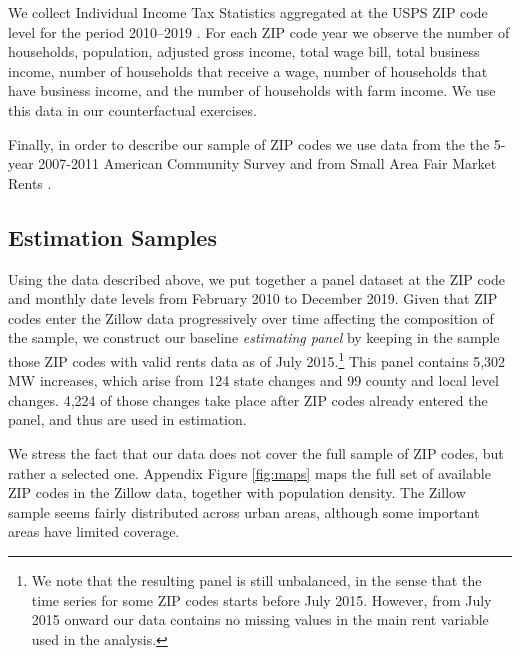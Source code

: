 We collect Individual Income Tax Statistics aggregated at the USPS ZIP code 
level for the period 2010--2019 \parencite{IRS}.
For each ZIP code year we observe the number of households, population, adjusted 
gross income, total wage bill, total business income, number of households that 
receive a wage, number of households that have business income, and the number 
of households with farm income.
We use this data in our counterfactual exercises.

Finally, in order to describe our sample of ZIP codes we use data from the 
the 5-year 2007-2011 American Community Survey \parencite[ACS;][]{ACS} and from 
Small Area Fair Market Rents \parencite[SAFMR;][]{hudSAFMR}.


\subsection{Estimation Samples}\label{sec:data_final_panel}

Using the data described above, we put together a panel dataset at the ZIP code and monthly 
date levels from February 2010 to December 2019. Given that ZIP codes enter the Zillow data 
progressively over time affecting the composition of the sample, we construct our baseline 
\textit{estimating panel} by keeping in the sample those ZIP codes with valid rents data as 
of July 2015.\footnote{We note that the resulting panel is still unbalanced, in the sense 
	that the time series for some ZIP codes starts before July 2015. However, from July
	2015 onward our data contains no missing values in the main rent variable used in the 
	analysis.} 
This panel contains 5,302 MW increases, which arise from 124 state changes and 99 county 
and local level changes. 4,224 of those changes take place after ZIP codes already entered
the panel, and thus are used in estimation.

We stress the fact that our data does not cover the full sample of ZIP codes, but rather 
a selected one. Appendix Figure \ref{fig:maps} maps the full set of available ZIP codes in 
the Zillow data, together with population density. The Zillow sample seems fairly 
distributed across urban areas, although some important areas have limited coverage.

